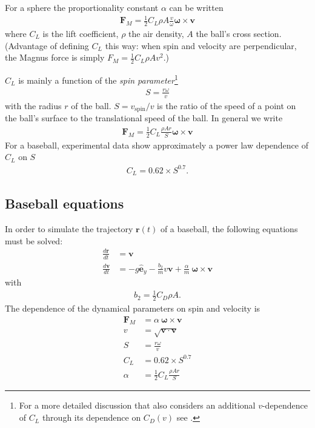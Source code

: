 \documentclass[letterpaper]{scrartcl}
\renewcommand{\vec}[1]{\ensuremath{\mathbf{#1}}}
\begin{document}
For a sphere the proportionality constant $\alpha$ can be written
\begin{gather}
  \vec{F}_M = \frac{1}{2} C_L \rho A \frac{v}{\omega}
  \boldsymbol{\omega} \times \vec{v}\label{eq:sphere}  
\end{gather}
where $C_L$ is the lift coefficient, $\rho$ the air density, $A$ the
ball's cross section. (Advantage of defining $C_L$ this way: when spin
and velocity are perpendicular, the Magnus force is simply
$F_M = \frac{1}{2} C_L \rho A v^2$.)

$C_L$ is mainly a function of the \emph{spin parameter}\footnote{For a
  more detailed discussion that also considers an additional
  $v$-dependence of $C_{L}$ through its dependence on $C_{D}(v)$ see
  \citet{Nathan:2008ac}.}
\begin{gather}
  S = \frac{r\omega}{v}\label{eq:S}  
\end{gather}
with the radius $r$ of the ball. $S = v_{\text{spin}}/v$ is the ratio of the speed of a
point on the ball's surface to the translational speed of the ball. In general we write
\begin{gather}
  \vec{F}_M = \frac{1}{2} C_L \frac{\rho A r}{S}
  \boldsymbol{\omega} \times \vec{v}\label{eq:FM}  
\end{gather}
For a baseball, experimental data show approximately a power law dependence of $C_L$ on $S$
\begin{gather}
  C_L = 0.62 \times S^{0.7}\label{eq:CL}.
\end{gather}

\subsection{Baseball equations}
\label{sec:eq}

In order to simulate the trajectory $\vec{r}(t)$ of a baseball, the
following equations must be solved:
\begin{align}
  \frac{d\vec{r}}{dt} &= \vec{v} \label{eq:drdtv}\\
  \frac{d\vec{v}}{dt} &= -g \hat{\vec{e}}_y  - \frac{b_2}{m} v \vec{v}
          + \frac{\alpha}{m}\ \boldsymbol{\omega} \times \vec{v} \label{eq:dvdta}
\end{align}
with
\begin{gather}
  \label{eq:CD}
  b_{2} = \frac{1}{2} C_{D} \rho A.
\end{gather}
The dependence of the dynamical parameters on spin and velocity is
\begin{align}
  \vec{F}_M &= \alpha\ \boldsymbol{\omega} \times \vec{v}\\
  v &= \sqrt{\vec{v}\cdot\vec{v}} \label{eq:vsquared}\\
  S &= \frac{r\omega}{v}\\
  C_L &= 0.62 \times S^{0.7}\\
  \alpha &= \frac{1}{2} C_L  \frac{\rho A r}{S}
\end{align}
\end{document}
